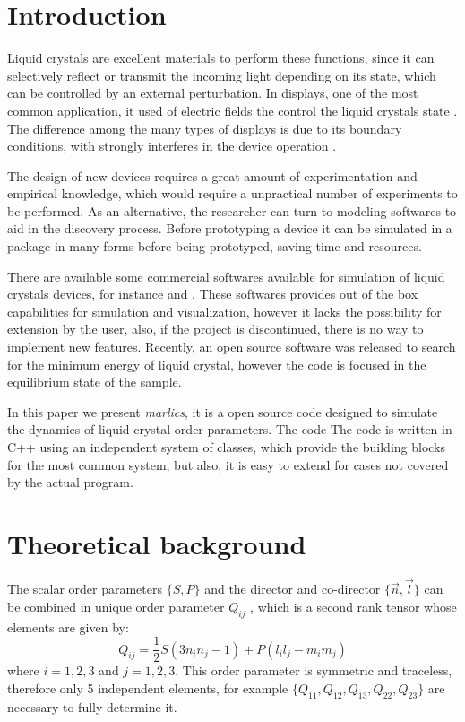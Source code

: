 \documentclass[final,5p,times,twocolumn]{elsarticle}
\begin{document}
\section{Introduction}
\label{Introduction}

Liquid crystals are excellent materials to perform these functions,
since it can selectively reflect or transmit the incoming light
depending on its state, which can be controlled by an external
perturbation. In displays, one of the most common application, it used
of electric fields the control the liquid crystals state \cite{}. The
difference among the many types of displays is due to its boundary
conditions, with strongly interferes in the device operation \cite{}.

The design of new devices requires a great amount of experimentation
and empirical knowledge, which would require a unpractical number of
experiments to be performed. As an alternative, the researcher can
turn to modeling softwares to aid in the discovery process. Before
prototyping a device it can be simulated in a package in many forms
before being prototyped, saving time and resources.

There are available some commercial softwares available for simulation
of liquid crystals devices, for instance \cite{} and \cite{}. These
softwares provides out of the box capabilities for simulation and
visualization, however it lacks the possibility for extension by the
user, also, if the project is discontinued, there is no way to
implement new features. Recently, an open source software was released
to search for the minimum energy of liquid crystal\cite{Sussman2019},
however the code is focused in the equilibrium state of the sample. 

In this paper we present \textit{marlics}, it is a open source code
designed to simulate the dynamics of liquid crystal order
parameters. The code The code is written in C++ using an independent
system of classes, which provide the building blocks for the most
common system, but also, it is easy to extend for cases not covered by
the actual program.

\section{Theoretical background}

The scalar order parameters $\lbrace S, P \rbrace$ and the director and co-director $\lbrace \vec{n}, \vec{l} \rbrace$ can be
combined in unique order parameter $Q_{ij}$ , which is a second rank tensor whose elements are given by:
\begin{equation}\label{eq:tensorial_parameter}
  Q_{ij}=\dfrac{1}{2} S ( 3 n_{i} n_{j}- 1) + P (l_i l_j - m_i m_j)
\end{equation}
where $i=1,2,3$ and $j=1,2,3$.  This order parameter is symmetric and traceless, therefore only 5 independent elements, for example $\lbrace Q_{11}, Q_{12},Q_{13}, Q_{22}, Q_{23} \rbrace $ are necessary to fully determine it.
\end{document}

